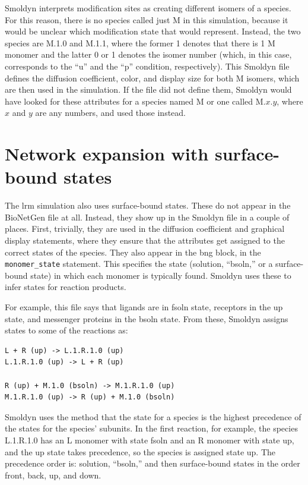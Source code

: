 \documentclass {book}
\newcommand {\ttt} {\texttt}
\begin{document}
Smoldyn interprets modification sites as creating different isomers of a species. For this reason, there is no species called just M in this simulation, because it would be unclear which modification state that would represent. Instead, the two species are M.1.0 and M.1.1, where the former 1 denotes that there is 1 M monomer and the latter 0 or 1 denotes the isomer number (which, in this case, corresponds to the ``u'' and the ``p'' condition, respectively). This Smoldyn file defines the diffusion coefficient, color, and display size for both M isomers, which are then used in the simulation. If the file did not define them, Smoldyn would have looked for these attributes for a species named M or one called M.$x$.$y$, where $x$ and $y$ are any numbers, and used those instead.

\section{Network expansion with surface-bound states}

The lrm simulation also uses surface-bound states. These do not appear in the BioNetGen file at all. Instead, they show up in the Smoldyn file in a couple of places. First, trivially, they are used in the diffusion coefficient and graphical display statements, where they ensure that the attributes get assigned to the correct states of the species. They also appear in the bng block, in the \ttt{monomer\_state} statement. This specifies the state (solution, ``bsoln,'' or a surface-bound state) in which each monomer is typically found. Smoldyn uses these to infer states for reaction products.

For example, this file says that ligands are in fsoln state, receptors in the up state, and messenger proteins in the bsoln state. From these, Smoldyn assigns states to some of the reactions as:

\begin{lstlisting}[style=SSAC]
L + R (up) -> L.1.R.1.0 (up)
L.1.R.1.0 (up) -> L + R (up)

R (up) + M.1.0 (bsoln) -> M.1.R.1.0 (up)
M.1.R.1.0 (up) -> R (up) + M.1.0 (bsoln)
\end{lstlisting}

Smoldyn uses the method that the state for a species is the highest precedence of the states for the species' subunits. In the first reaction, for example, the species L.1.R.1.0 has an L monomer with state fsoln and an R monomer with state up, and the up state takes precedence, so the species is assigned state up. The precedence order is: solution, ``bsoln,'' and then surface-bound states in the order front, back, up, and down.
\end{document}
